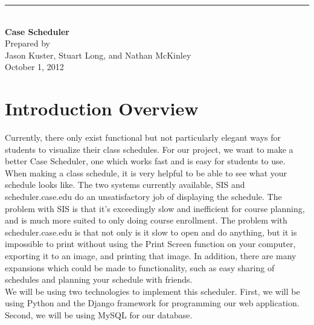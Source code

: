\documentclass[pdftex,12pt,letter]{article}
\newcommand{\HRule}{\rule{\linewidth}{0.5mm}}
\begin{document}
\begin{titlepage}
\begin{flushright}
\HRule \\
{\huge \bfseries Case Scheduler\\[4cm]}
{\large Prepared by\\Jason Kuster, Stuart Long, and Nathan McKinley\\[1cm]
October 1, 2012}
\end{flushright}
\end{titlepage}
\section*{Introduction Overview}
Currently, there only exist functional but not particularly elegant ways for students to visualize their class schedules. For our project, we want to make a better Case Scheduler, one which works fast and is easy for students to use.\\

\noindent When making a class schedule, it is very helpful to be able to see what your schedule looks like. The two systems currently available, SIS and scheduler.case.edu do an unsatisfactory job of displaying the schedule. The problem with SIS is that it's exceedingly slow and inefficient for course planning, and is much more suited to only doing course enrollment. The problem with scheduler.case.edu is that not only is it slow to open and do anything, but it is impossible to print without using the Print Screen function on your computer, exporting it to an image, and printing that image. In addition, there are many expansions which could be made to functionality, such as easy sharing of schedules and planning your schedule with friends.\\

\noindent We will be using two technologies to implement this scheduler. First, we will be using Python and the Django framework for programming our web application. Second, we will be using MySQL for our database.
\end{document}
